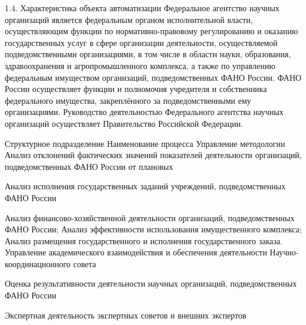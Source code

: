 1.4. Характеристика объекта автоматизации
Федеральное агентство научных организаций является федеральным органом исполнительной власти, осуществляющим функции по нормативно-правовому регулированию и оказанию государственных услуг в сфере организации деятельности, осуществляемой подведомственными организациями, в том числе в области науки, образования, здравоохранения и агропромышленного комплекса, а также по управлению федеральным имуществом организаций, подведомственных ФАНО России. ФАНО России осуществляет функции и полномочия учредителя и собственника федерального имущества, закреплённого за подведомственными ему организациями. Руководство деятельностью Федерального агентства научных организаций осуществляет Правительство Российской Федерации.


Структурное подразделение
Наименование процесса
Управление методологии
Анализ отклонений фактических значений показателей деятельности организаций, подведомственных ФАНО России от плановых 

Анализ исполнения государственных заданий учреждений, подведомственных ФАНО России

Анализ финансово-хозяйственной деятельности организаций, подведомственных ФАНО России; 
Анализ эффективности использования имущественного комплекса;
Анализ размещения государственного и исполнения государственного заказа.
Управление академического взаимодействия и обеспечения деятельности Научно-координационного совета

Оценка результативности деятельности научных организаций, подведомственных ФАНО России

Экспертная деятельность экспертных советов и внешних экспертов


